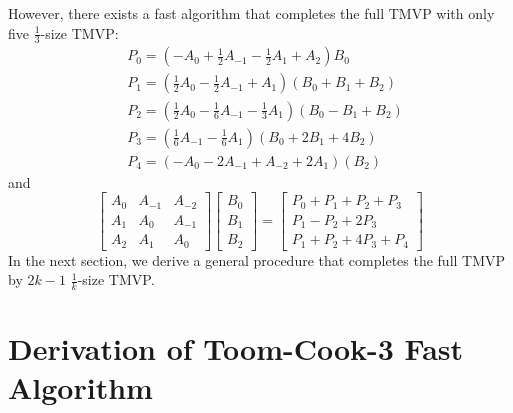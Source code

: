\documentclass[
11pt,notheorems,hyperref={pdfauthor=whatever}
]{beamer}
\begin{document}
\begin{frame}
    However, there exists a fast algorithm that completes the full TMVP with only five $\frac13$-size TMVP:
    \[
    \begin{aligned}
    & P_0=\left(-A_0+\frac{1}{2} A_{-1}-\frac{1}{2} A_1+A_2\right)B_{0} \\
    & P_1=\left(\frac{1}{2} A_0-\frac{1}{2} A_{-1}+A_1\right)\left(B_{0} + B_{1} + B_{2}\right) \\
    & P_2=\left(\frac{1}{2} A_0-\frac{1}{6} A_{-1}-\frac{1}{3} A_1\right)\left(B_{0}-B_{1}+B_{2}\right) \\
    & P_3=\left(\frac{1}{6} A_{-1}-\frac{1}{6} A_1\right)\left(B_{0} + 2B_{1}+4B_{2}\right) \\
    & P_4=\left(-A_0-2 A_{-1}+A_{-2}+2 A_1\right)\left(B_{2}\right)
    \end{aligned}
    \]
    and
    \[
    \begin{bmatrix}
        A_{0} & A_{-1} & A_{-2}\\
        A_{1} & A_{0} & A_{-1}\\
        A_{2} & A_{1} & A_{0}
    \end{bmatrix}
    \begin{bmatrix}
        B_{0} \\ B_{1} \\ B_{2}
    \end{bmatrix}
    =
    \begin{bmatrix}
        P_{0} + P_{1} + P_{2} + P_{3}\\
        P_{1} - P_{2} + 2 P_{3}\\
        P_{1} + P_{2} + 4P_{3}+P_{4}
    \end{bmatrix}
    \]
    In the next section, we derive a general procedure that completes the full TMVP by $2k-1$ $\frac{1}{k}$-size TMVP.
\end{frame}




\section{Derivation of Toom-Cook-3 Fast Algorithm}
\end{document}
